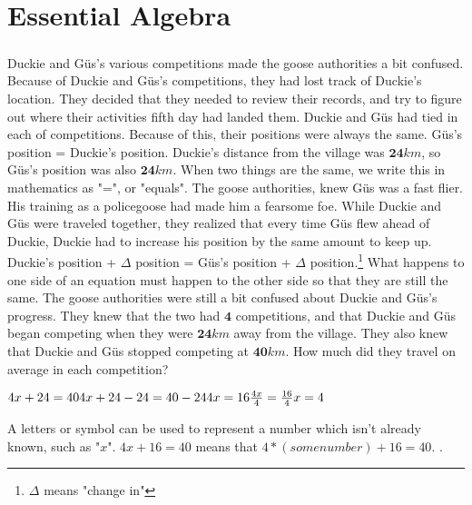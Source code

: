 \chapter{Essential Algebra}
\paragraph{} Duckie and Güs's various competitions made the goose authorities a bit confused. Because of Duckie and Güs's competitions, they had lost track of Duckie's location. They decided that they needed to review their records, and try to figure out where their activities fifth day had landed them. 
\vfill
\pagebreak
{Duckie and Güs had tied in each of competitions. Because of this, their positions were always the same.}
{Güs's position = Duckie's position. Duckie's distance from the village was $\mathbf{24}km$, so Güs's position was also $\mathbf{24}km$.}
{When two things are the same, we write this in mathematics as "=", or "equals".}
{}
{The goose authorities, knew Güs was a fast flier. His training as a policegoose had made him a fearsome foe. While Duckie and Güs were traveled together, they realized that every time Güs flew ahead of Duckie, Duckie had to increase his position by the same amount to keep up.}
{Duckie's position + $\Delta$ position = Güs's position + $\Delta$ position.\footnote{$\Delta$ means "change in"}}
{What happens to one side of an equation must happen to the other side so that they are still the same.}
{}
{The goose authorities were still a bit confused about Duckie and Güs's progress. They knew that the two had $\mathbf{4}$ competitions, and that Duckie and Güs began competing when they were $\mathbf{24} km$ away from the village. They also knew that Duckie and Güs stopped competing at $\mathbf{40} km$. How much did they travel on average in each competition?}
{\begin{center}$4x + 24 = 40 \linebreak 4x + 24 - 24= 40 - 24 \linebreak 4x = 16 \linebreak \frac{4x}{4} = \frac{16}{4} \linebreak x = 4  $\end{center}}
{A letters or symbol can be used to represent a number which isn’t already known, such as "$x$". $4x + 16 = 40$ means that $4\ast(some number) + 16 = 40$.}
{}.